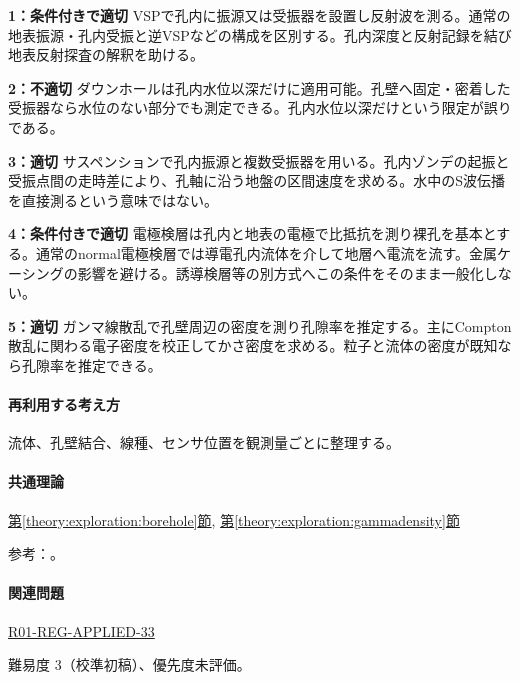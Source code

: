\noindent\textbf{1：条件付きで適切} VSPで孔内に振源又は受振器を設置し反射波を測る。通常の地表振源・孔内受振と逆VSPなどの構成を区別する。孔内深度と反射記録を結び地表反射探査の解釈を助ける。\par

\noindent\textbf{2：不適切} ダウンホールは孔内水位以深だけに適用可能。孔壁へ固定・密着した受振器なら水位のない部分でも測定できる。孔内水位以深だけという限定が誤りである。\par

\noindent\textbf{3：適切} サスペンションで孔内振源と複数受振器を用いる。孔内ゾンデの起振と受振点間の走時差により、孔軸に沿う地盤の区間速度を求める。水中のS波伝播を直接測るという意味ではない。\par

\noindent\textbf{4：条件付きで適切} 電極検層は孔内と地表の電極で比抵抗を測り裸孔を基本とする。通常のnormal電極検層では導電孔内流体を介して地層へ電流を流す。金属ケーシングの影響を避ける。誘導検層等の別方式へこの条件をそのまま一般化しない。\par

\noindent\textbf{5：適切} ガンマ線散乱で孔壁周辺の密度を測り孔隙率を推定する。主にCompton散乱に関わる電子密度を校正してかさ密度を求める。粒子と流体の密度が既知なら孔隙率を推定できる。\par

\paragraph{再利用する考え方} 流体、孔壁結合、線種、センサ位置を観測量ごとに整理する。

\paragraph{共通理論} \hyperref[theory:exploration:borehole]{第\ref*{theory:exploration:borehole}節}, \hyperref[theory:exploration:gammadensity]{第\ref*{theory:exploration:gammadensity}節}

\par 参考：\cite{epa_borehole_resistivity,epa_gamma_density,geebec_ps,oyo_suspension}。

\paragraph{関連問題} \hyperref[q:r01-reg-applied-33]{R01-REG-APPLIED-33}

\par 難易度 3（校準初稿）、優先度未評価。

